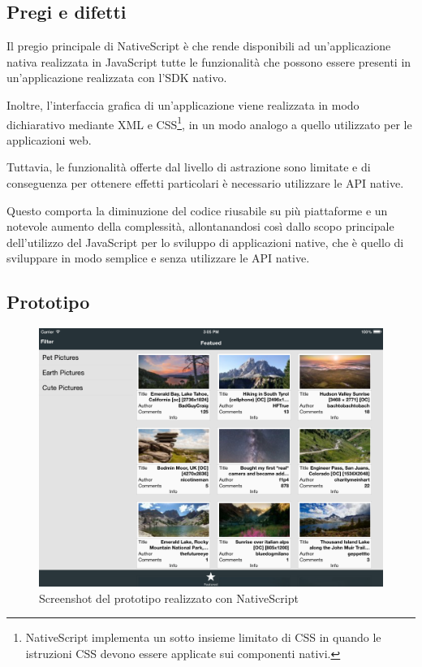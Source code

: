 \subsection{Pregi e difetti}

Il pregio principale di NativeScript è che rende disponibili ad un'applicazione nativa realizzata in JavaScript tutte le funzionalità che possono essere presenti in un'applicazione realizzata con l'SDK nativo. 

Inoltre, l'interfaccia grafica di un'applicazione viene realizzata in modo dichiarativo mediante XML e CSS\footnote{NativeScript implementa un sotto insieme limitato di CSS in quando le istruzioni CSS devono essere applicate sui componenti nativi.}, in un modo analogo a quello utilizzato per le applicazioni web.

Tuttavia, le funzionalità offerte dal livello di astrazione sono limitate e di conseguenza per ottenere effetti particolari è necessario utilizzare le API native.

Questo comporta la diminuzione del codice riusabile su più piattaforme e un notevole aumento della complessità, allontanandosi così dallo scopo principale dell'utilizzo del JavaScript per lo sviluppo di applicazioni native, che è quello di sviluppare in modo semplice e senza utilizzare le API native.

\subsection{Prototipo}

\begin{figure}[htp]
\centering
\includegraphics[width=\textwidth]{../immagini/prototipo-react-native}
\caption{Screenshot del prototipo realizzato con NativeScript}  
\end{figure}

